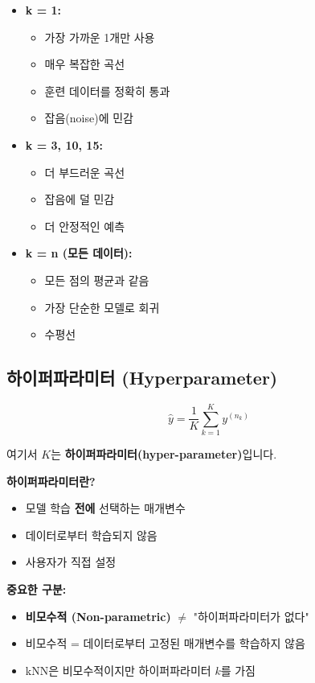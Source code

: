 \documentclass[12pt,a4paper]{article}
\begin{document}
\begin{itemize}
    \item \textbf{k = 1:}
    \begin{itemize}
        \item 가장 가까운 1개만 사용
        \item 매우 복잡한 곡선
        \item 훈련 데이터를 정확히 통과
        \item 잡음(noise)에 민감
    \end{itemize}

    \item \textbf{k = 3, 10, 15:}
    \begin{itemize}
        \item 더 부드러운 곡선
        \item 잡음에 덜 민감
        \item 더 안정적인 예측
    \end{itemize}

    \item \textbf{k = n (모든 데이터):}
    \begin{itemize}
        \item 모든 점의 평균과 같음
        \item 가장 단순한 모델로 회귀
        \item 수평선
    \end{itemize}
\end{itemize}

\subsection{하이퍼파라미터 (Hyperparameter)}

\begin{equation}
\hat{y} = \frac{1}{K}\sum_{k=1}^{K}y^{(n_k)}
\end{equation}

여기서 $K$는 \textbf{하이퍼파라미터(hyper-parameter)}입니다.

\textbf{하이퍼파라미터란?}
\begin{itemize}
    \item 모델 학습 \textbf{전에} 선택하는 매개변수
    \item 데이터로부터 학습되지 않음
    \item 사용자가 직접 설정
\end{itemize}

\textbf{중요한 구분:}
\begin{itemize}
    \item \textbf{비모수적 (Non-parametric)} $\neq$ "하이퍼파라미터가 없다"
    \item 비모수적 = 데이터로부터 고정된 매개변수를 학습하지 않음
    \item kNN은 비모수적이지만 하이퍼파라미터 $k$를 가짐
\end{itemize}
\end{document}

